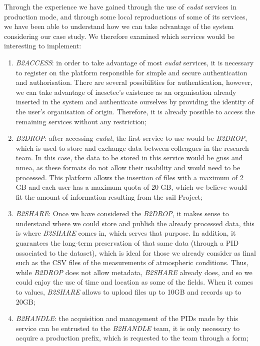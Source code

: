 Through the experience we have gained through the use of \textit{\gls{eudat}} services in production mode, and through some local reproductions of some of its services, we have been able to understand how we can take advantage of the system considering our case study. We therefore examined which services would be interesting to implement:

\begin{enumerate}
    \item \textit{B2ACCESS}: in order to take advantage of most \textit{\gls{eudat}} services, it is necessary to register on the platform responsible for simple and secure authentication and authorisation. There are several possibilities for authentication, however, we can take advantage of \gls{inesctec}'s existence as an organisation already inserted in the system and authenticate ourselves by providing the identity of the user's organisation of origin. Therefore, it is already possible to access the remaining services without any restriction;
    \item \textit{B2DROP}: after accessing \textit{\gls{eudat}}, the first service to use would be \textit{B2DROP}, which is used to store and exchange data between colleagues in the research team. In this case, the data to be stored in this service would be \gls{gnss} and \gls{nmea}, as these formats do not allow their usability and would need to be processed. This platform allows the insertion of files with a maximum of 2 GB and each user has a maximum quota of 20 GB, which we believe would fit the amount of information resulting from the \gls{sail} Project;
    \item \textit{B2SHARE}: Once we have considered the \textit{B2DROP}, it makes sense to understand where we could store and publish the already processed data, this is where \textit{B2SHARE} comes in, which serves that purpose. In addition, it guarantees the long-term preservation of that same data (through a PID associated to the dataset), which is ideal for those we already consider as final such as the CSV files of the measurements of atmospheric conditions. Thus, while \textit{B2DROP} does not allow metadata, \textit{B2SHARE} already does, and so we could enjoy the use of time and location as some of the fields. When it comes to values, \textit{B2SHARE} allows to upload files up to 10GB and records up to 20GB;
    \item \textit{B2HANDLE}: the acquisition and management of the PIDs made by this service can be entrusted to the \textit{B2HANDLE} team, it is only necessary to acquire a production prefix, which is requested to the team through a form;

\end{enumerate}
